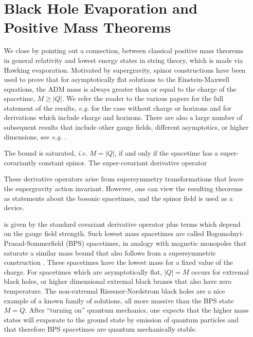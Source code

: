 \documentclass[12pt]{article}
\newcommand{\sectiono}[1]{\section{#1}\setcounter{equation}{0}}
\begin{document}
\sectiono{Black Hole Evaporation and Positive Mass Theorems}
\label{s7}

We close  by pointing out a connection, between classical
positive mass theorems in general relativity and lowest energy states
in string theory, which is made via Hawking evaporation.
Motivated by supergravity, spinor constructions have been used to prove that for
asymptotically flat solutions to the Einstein-Maxwell equations, the ADM
mass is
always greater than or
equal to the charge of the spacetime, $M\ge |Q|$. We refer the reader to
the various papers for the full statement of the results, {\it e.g.}
\cite{witten,nester} for the case without charge or horizons and
\cite{gibhull,ghhp}  for
derivations which include charge and horizons. There are also a large number of subsequent
results that include other gauge fields, different asymptotics, or higher
dimensions, see {\it
e.g.} \cite{sorkin,gktt}.

The bound is saturated, {\it i.e.}  $M=|Q|$, if and only if the spacetime
has a super-covariantly constant spinor. The super-covariant derivative
operator\begin{footnote}{These
derivative operators arise
from supersymmetry transformations that leave the supergravity action
invariant. However, one can view the
resulting theorems as statements about the bosonic spacetimes, and the
spinor field is used as a device.}
\end{footnote}%
is given by the standard covariant derivative operator plus terms which
depend on the gauge field strength. Such lowest mass spacetimes are called
Bogomolnyi-Prasad-Sommerfield
(BPS) spacetimes, in analogy with magnetic monopoles that saturate a
similar mass bound \cite{bogo,prasad}
that also follows from a supersymmetric construction \cite{wo}.
These spacetimes have the lowest mass for a fixed value of the charge.
For spacetimes which are asymptotically flat, $|Q|=M$ occurs for extremal
black holes,
or higher dimensional extremal black branes that also have zero temperature.
The non-extremal Riessner-Nordstrom black holes are a nice example of a
known family
of solutions, all more massive than the BPS state $M=Q$.
After ``turning on'' quantum mechanics, one expects that
the higher mass states will evaporate to the ground state by emission
of quantum particles and that therefore BPS spacetimes are quantum
mechanically stable.
\end{document}

